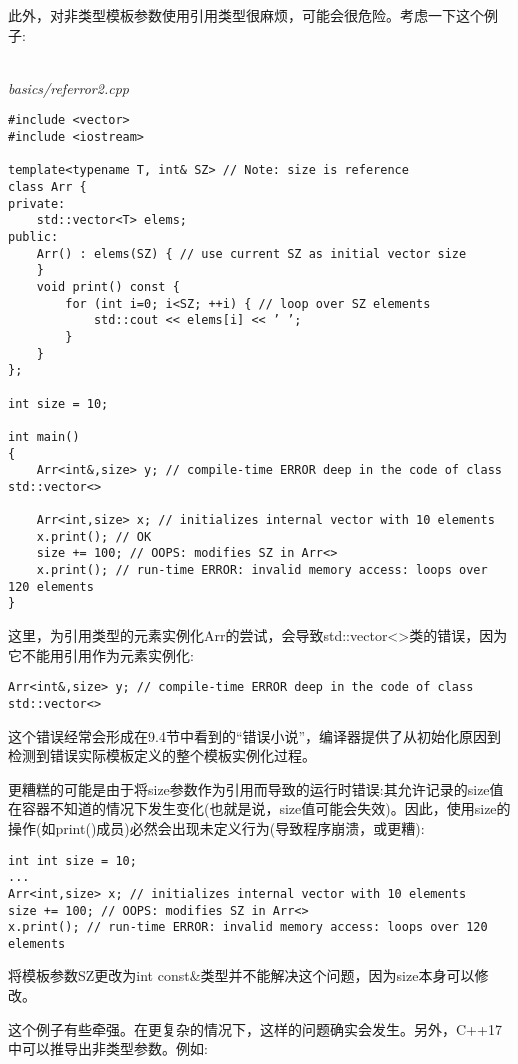 此外，对非类型模板参数使用引用类型很麻烦，可能会很危险。考虑一下这个例子:

\hspace*{\fill} \\ %
\noindent
\textit{basics/referror2.cpp}
\begin{lstlisting}[style=styleCXX]
#include <vector>
#include <iostream>

template<typename T, int& SZ> // Note: size is reference
class Arr {
private:
	std::vector<T> elems;
public:
	Arr() : elems(SZ) { // use current SZ as initial vector size
	}
	void print() const {
		for (int i=0; i<SZ; ++i) { // loop over SZ elements
			std::cout << elems[i] << ’ ’;
		}
	}
};

int size = 10;

int main()
{
	Arr<int&,size> y; // compile-time ERROR deep in the code of class std::vector<>
	
	Arr<int,size> x; // initializes internal vector with 10 elements
	x.print(); // OK
	size += 100; // OOPS: modifies SZ in Arr<>
	x.print(); // run-time ERROR: invalid memory access: loops over 120 elements
}
\end{lstlisting}

这里，为引用类型的元素实例化Arr的尝试，会导致std::vector<>类的错误，因为它不能用引用作为元素实例化:

\begin{lstlisting}[style=styleCXX]
Arr<int&,size> y; // compile-time ERROR deep in the code of class std::vector<>
\end{lstlisting}

这个错误经常会形成在9.4节中看到的“错误小说”，编译器提供了从初始化原因到检测到错误实际模板定义的整个模板实例化过程。

更糟糕的可能是由于将size参数作为引用而导致的运行时错误:其允许记录的size值在容器不知道的情况下发生变化(也就是说，size值可能会失效)。因此，使用size的操作(如print()成员)必然会出现未定义行为(导致程序崩溃，或更糟):

\begin{lstlisting}[style=styleCXX]
int int size = 10;
...
Arr<int,size> x; // initializes internal vector with 10 elements
size += 100; // OOPS: modifies SZ in Arr<>
x.print(); // run-time ERROR: invalid memory access: loops over 120 elements
\end{lstlisting}

将模板参数SZ更改为int const\&类型并不能解决这个问题，因为size本身可以修改。

这个例子有些牵强。在更复杂的情况下，这样的问题确实会发生。另外，C++17中可以推导出非类型参数。例如:

